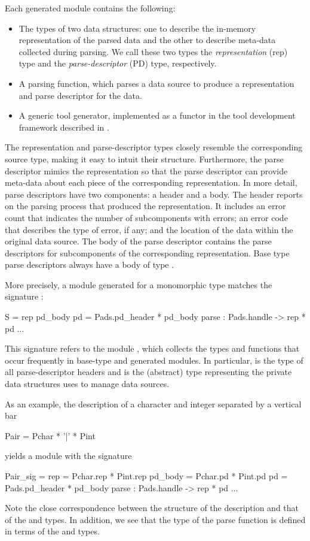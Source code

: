 Each generated module contains the following:
\begin{itemize}
\item The types of two data structures: one to describe the in-memory
  representation of the parsed data and the other to describe meta-data
  collected during parsing.  We call these two types the
  \emph{representation} (rep) type and the \emph{parse-descriptor} (PD)
  type, respectively.
\item A parsing function, which parses a data source to produce a
  representation and parse descriptor for the data.
\item A generic tool generator, implemented as a functor
  in the tool development framework described in .
\end{itemize} 
\noindent
The representation and parse-descriptor types closely resemble the
corresponding source type, making it easy to intuit their
structure. Furthermore, the parse descriptor mimics the representation 
so that the parse descriptor can provide meta-data about
each piece of the corresponding representation. In more detail, parse
descriptors have two components: a header and a body. The header
reports on the parsing process that produced the representation. It
includes an error count that indicates the number of subcomponents
with errors; an error code that describes the type of error, if any;
and the location of the data within the original data source. The body
of the parse descriptor contains the parse descriptors for 
subcomponents of the corresponding representation.  Base type parse
descriptors always have a body of type .

More precisely, a module generated for a monomorphic \padsml{} type 
matches the signature :
\begin{code}\scriptsize
{}  S = 
   rep
   pd\_body
   pd = Pads.pd_header * pd_body
   parse : Pads.handle -> rep * pd
  ...
\end{code}%
This signature refers to the module , which collects the
types and functions that occur frequently in base-type and generated
modules. In particular,  is the type of all
parse-descriptor headers and  is the (abstract) type
representing the private data structures \padsml{} uses to manage data
sources. 

As an example, the \padsml{} description of a character
and integer separated by a vertical bar
\begin{code}\scriptsize
   Pair = Pchar * '|' * Pint\end{code}%
yields a module with the signature
\begin{code}\scriptsize
{}  Pair_sig = 
   rep = Pchar.rep * Pint.rep
   pd_body = Pchar.pd  * Pint.pd
   pd = Pads.pd_header * pd_body
   parse : Pads.handle -> rep * pd
  ...
\end{code}%
Note the close correspondence between the structure of the description
and that of the  and  types. In addition, we see
that the type of the parse function is defined in terms of the
 and  types.

